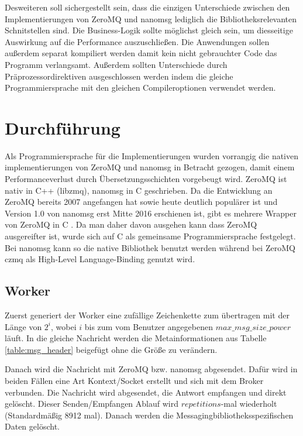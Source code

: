 \documentclass{article}
\begin{document}
Desweiteren soll sichergestellt sein, dass die einzigen Unterschiede
zwischen den Implementierungen von ZeroMQ und nanomsg lediglich die
Bibliotheksrelevanten Schnitstellen sind. Die Business-Logik sollte möglichst
gleich sein, um diesseitige Auswirkung auf die Performance
auszuschließen. Die Anwendungen sollen außerdem separat kompiliert
werden damit kein nicht gebrauchter Code das Programm verlangsamt. Außerdem
sollten Unterschiede durch Präprozessordirektiven
ausgeschlossen werden indem die gleiche Programmiersprache mit den
gleichen Compileroptionen verwendet werden.

\section{Durchführung}

Als Programmiersprache für die Implementierungen wurden vorrangig die
nativen implementierungen von ZeroMQ und nanomsg in Betracht gezogen,
damit einem Performanceverlust durch Übersetzungsschichten vorgebeugt
wird. ZeroMQ ist nativ in C++ (libzmq), nanomsg in C geschrieben. Da die
Entwicklung an ZeroMQ bereits 2007 angefangen hat sowie heute deutlich
populärer ist und Version 1.0 von nanomsg erst Mitte 2016 erschienen
ist, gibt es mehrere Wrapper von ZeroMQ in C \cite{noauthor_omq_2007}.
Da man daher davon ausgehen kann dass ZeroMQ
ausgereifter ist, wurde sich auf C als gemeinsame Programmiersprache
festgelegt. Bei nanomsg kann so die native Bibliothek benutzt werden
während bei ZeroMQ czmq als High-Level Language-Binding genutzt wird.

\subsection{Worker}

Zuerst generiert der Worker eine zufällige Zeichenkette zum übertragen
mit der Länge von $2^i$, wobei $i$ bis zum vom Benutzer angegebenen
$max\_msg\_size\_power$ läuft. In die gleiche Nachricht werden die
Metainformationen aus Tabelle \ref{table:msg_header} beigefügt
ohne die Größe zu verändern.

Danach wird die Nachricht mit ZeroMQ bzw. nanomsg abgesendet. Dafür wird
in beiden Fällen eine Art Kontext/Socket erstellt und sich mit dem
Broker verbunden. Die Nachricht wird abgesendet, die Antwort empfangen
und direkt gelöscht. Dieser Senden/Empfangen Ablauf wird
$repetitions$-mal wiederholt (Standardmäßig 8912 mal). Danach werden die
Messagingbibliotheksspezifischen Daten gelöscht.
\end{document}
